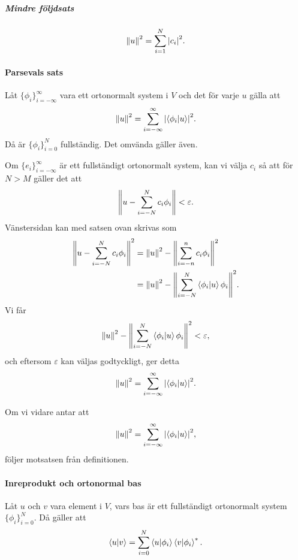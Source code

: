 \subparagraph{Mindre följdsats}
\begin{align*}
	\norm{u}^{2} = \sum\limits_{i = 1}^{N}\abs{c_{i}}^{2}.
\end{align*}

\paragraph{Parsevals sats}
Låt $\{\phi_{i}\}_{i = -\infty}^{\infty}$ vara ett ortonormalt system i $V$ och det för varje $u$ gälla att
\begin{align*}
	\norm{u}^{2} = \sum\limits_{i = -\infty}^{\infty}\abs{\bra{\phi_{i}}\ket{u}}^{2}.
\end{align*}
Då är $\{\phi_{i}\}_{i = 0}^{N}$ fullständig. Det omvända gäller även.

\proof
Om $\{e_{i}\}_{i = -\infty}^{\infty}$ är ett fullständigt ortonormalt system, kan vi välja $c_{i}$ så att för $N > M$ gäller det att
\begin{align*}
	\norm{u - \sum\limits_{i = -N}^{N}c_{i}\phi_{i}} < \varepsilon.
\end{align*}
Vänstersidan kan med satsen ovan skrivas som
\begin{align*}
	\norm{u - \sum\limits_{i = -N}^{N}c_{i}\phi_{i}}^{2} &= \norm{u}^{2} - \norm{\sum\limits_{i = -n}^{n}c_{i}\phi_{i}}^{2} \\
	                                                    &= \norm{u}^{2} - \norm{\sum\limits_{i = -N}^{N}\bra{\phi_{i}}\ket{u}\phi_{i}}^{2}.
\end{align*}
Vi får
\begin{align*}
	\norm{u}^{2} - \norm{\sum\limits_{i = -N}^{N}\bra{\phi_{i}}\ket{u}\phi_{i}}^{2} < \varepsilon,
\end{align*}
och eftersom $\varepsilon$ kan väljas godtyckligt, ger detta
\begin{align*}
	\norm{u}^{2} = \sum\limits_{i = -\infty}^{\infty}\abs{\bra{\phi_{i}}\ket{u}}^{2}.
\end{align*}

Om vi vidare antar att
\begin{align*}
	\norm{u}^{2} = \sum\limits_{i = -\infty}^{\infty}\abs{\bra{\phi_{i}}\ket{u}}^{2},
\end{align*}
följer motsatsen från definitionen.

\paragraph{Inreprodukt och ortonormal bas}
Låt $u$ och $v$ vara element i $V$, vars bas är ett fullständigt ortonormalt system $\{\phi_{i}\}_{i = 0}^{N}$. Då gäller att
\begin{align*}
	\bra{u}\ket{v} = \sum\limits_{i = 0}^{N}\bra{u}\ket{\phi_{i}}\bra{v}\ket{\phi_{i}}^{*}.
\end{align*}

